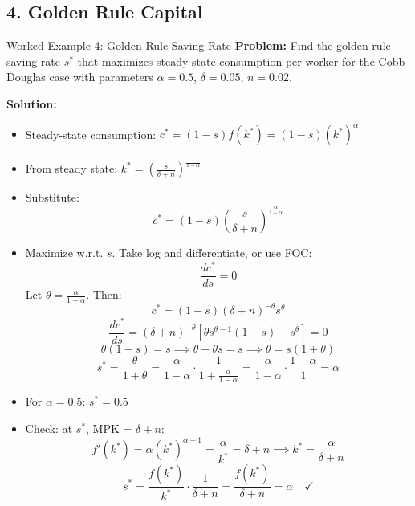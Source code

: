 \subsection{4. Golden Rule Capital}

\begin{frame}{Worked Example 4: Golden Rule Saving Rate}
\textbf{Problem:} Find the golden rule saving rate $s^*$ that maximizes steady-state consumption per worker for the Cobb-Douglas case with parameters $\alpha = 0.5$, $\delta = 0.05$, $n = 0.02$.

\bigskip
\textbf{Solution:}

\begin{itemize}
\item Steady-state consumption: $c^* = (1-s)f(k^*) = (1-s)(k^*)^\alpha$
\item From steady state: $k^* = \left(\frac{s}{\delta + n}\right)^{\frac{1}{1-\alpha}}$
\item Substitute:
\[
c^* = (1-s)\left(\frac{s}{\delta + n}\right)^{\frac{\alpha}{1-\alpha}}
\]
\item Maximize w.r.t. $s$. Take log and differentiate, or use FOC:
\[
\frac{d c^*}{ds} = 0
\]
Let $\theta = \frac{\alpha}{1-\alpha}$. Then:
\[
c^* = (1-s)(\delta + n)^{-\theta} s^{\theta}
\]
\[
\frac{d c^*}{ds} = (\delta + n)^{-\theta}[\theta s^{\theta-1}(1-s) - s^{\theta}] = 0
\]
\[
\theta(1-s) = s \implies \theta - \theta s = s \implies \theta = s(1+\theta)
\]
\[
s^* = \frac{\theta}{1+\theta} = \frac{\alpha}{1-\alpha} \cdot \frac{1}{1 + \frac{\alpha}{1-\alpha}} = \frac{\alpha}{1-\alpha} \cdot \frac{1-\alpha}{1} = \alpha
\]
\item For $\alpha = 0.5$: $s^* = 0.5$
\item Check: at $s^*$, MPK = $\delta + n$:
\[
f'(k^*) = \alpha (k^*)^{\alpha-1} = \frac{\alpha}{k^*} = \delta + n \implies k^* = \frac{\alpha}{\delta + n}
\]
\[
s^* = \frac{f(k^*)}{k^*} \cdot \frac{1}{\delta + n} = \frac{f(k^*)}{\delta + n} = \alpha \quad \checkmark
\]
\end{itemize}


\end{frame}

